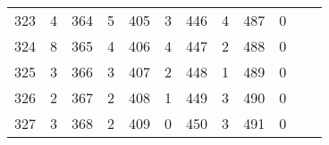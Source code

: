 \begin{table}[H]
\begin{tabular}{S S | S S | S S | S S | S S | S S}
        323 &  4  &  364  &  5  &  405 &    3  &  446 &    4  &  487 &    0  &      &       \\
        324 &  8  &  365  &  4  &  406 &    4  &  447 &    2  &  488 &    0  &      &       \\
        325 &  3  &  366  &  3  &  407 &    2  &  448 &    1  &  489 &    0  &      &       \\
        326 &  2  &  367  &  2  &  408 &    1  &  449 &    3  &  490 &    0  &      &       \\
        327 &  3  &  368  &  2  &  409 &    0  &  450 &    3  &  491 &    0  &      &       \\
  \bottomrule
      \end{tabular}
    \end{table}